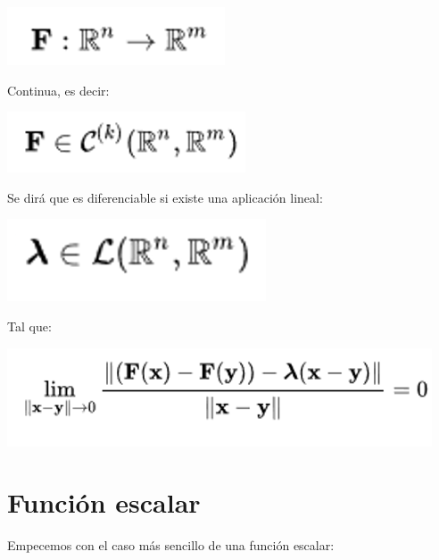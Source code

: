 \documentclass[11pt,a4paper,oldfontcommands,oneside]{memoir}
\begin{document}
\begin{center}
\includegraphics[scale=.75]{1.png} \\
\end{center}
 
Continua, es decir: \\

\begin{center}
\includegraphics[scale=.75]{2.png} \\
\end{center}

Se dirá que es diferenciable si existe una aplicación lineal: \\

\begin{center}
\includegraphics[scale=.75]{3.png} \\
\end{center}

Tal que: \\

\begin{center}
\includegraphics[scale=.75]{4.png} \\ 
\end{center}

\section{Función escalar}
Empecemos con el caso más sencillo de una función escalar: \\
\end{document}
